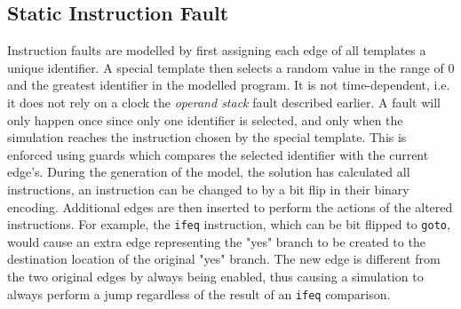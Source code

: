 \subsection{Static Instruction Fault}
Instruction faults are modelled by first assigning each edge of all templates a unique identifier. A special template then selects a random value in the range of $0$ and the greatest identifier in the modelled program. It is not time-dependent, i.e. it does not rely on a clock the \textit{operand stack} fault described earlier. A fault will only happen once since only one identifier is selected, and only when the simulation reaches the instruction chosen by the special template. This is enforced using guards which compares the selected identifier with the current edge's. During the generation of the model, the solution has calculated all instructions, an instruction can be changed to by a bit flip in their binary encoding. Additional edges are then inserted to perform the actions of the altered instructions. For example, the \texttt{ifeq} instruction, which can be bit flipped to \texttt{goto}, would cause an extra edge representing the "yes" branch to be created to the destination location of the original "yes" branch. The new edge is different from the two original edges by always being enabled, thus causing a simulation to always perform a jump regardless of the result of an \texttt{ifeq} comparison.